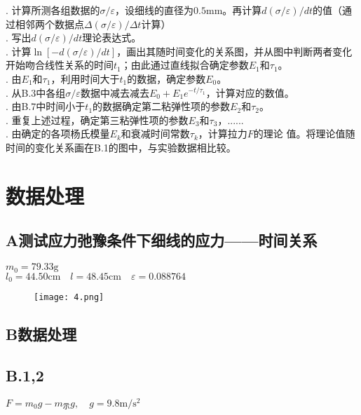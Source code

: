 \documentclass{ctexart}
\begin{document}
. 计算所测各组数据的$\sigma/\varepsilon$，设细线的直径为$0.5\mathrm{mm}$。再计算$d(\sigma/\varepsilon)/dt$的值（通过相邻两个数据点$\Delta(\sigma/\varepsilon)/\Delta t$计算）\\
. 写出$d(\sigma/\varepsilon)/dt$理论表达式。\\
. 计算$\ln[-d(\sigma/\varepsilon)/dt]$，画出其随时间变化的关系图，并从图中判断两者变化开始吻合线性关系的时间$t_1$；由此通过直线拟合确定参数$E_1$和$\tau_1$。 \\
. 由$E_1$和$\tau_1$，利用时间大于$t_1$的数据，确定参数$E_0$。   \\
. 从B.3中各组$\sigma/\varepsilon$数据中减去减去$E_0+E_1e^{-t/\tau_1}$，计算对应的数值。\\

. 由B.7中时间小于$t_1$的数据确定第二粘弹性项的参数$E_2$和$\tau_2$。\\
. 重复上述过程，确定第三粘弹性项的参数$E_3$和$\tau_3$，......\\
. 由确定的各项杨氏模量$E_k$和衰减时间常数$\tau_k$，计算拉力$F$的理论
值。将理论值随时间的变化关系画在B.1的图中，与实验数据相比较。\\
\clearpage

\section{数据处理}

\subsection*{A\quad 测试应力弛豫条件下细线的应力——时间关系}
\noindent $m_0=79.33\mathrm{g}$\\
\noindent $l_0=44.50\mathrm{cm} \quad l=48.45\mathrm{cm} \quad \varepsilon=0.088764$

\begin{figure}[htbp]
  \centering
  \texttt{[image: 4.png]}
\end{figure}

\subsection*{B\quad 数据处理}
\subsection*{B.1,2}
\noindent $F=m_0g-m_{\text{示}}g,\quad g=9.8\mathrm{m/s^2}$
\end{document}
